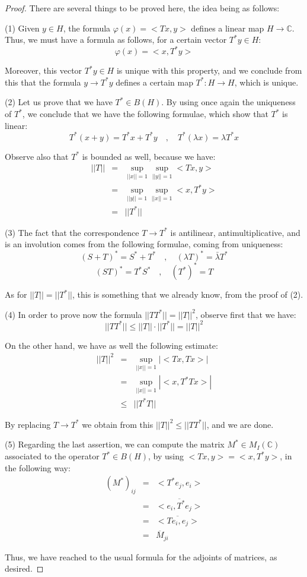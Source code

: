 \documentclass[12pt]{amsbook}
\begin{document}
\begin{proof}
There are several things to be proved here, the idea being as follows:

\medskip

(1) Given $y\in H$, the formula $\varphi(x)=<Tx,y>$ defines a linear map $H\to\mathbb C$. Thus, we must have a formula as follows, for a certain vector $T^*y\in H$:
$$\varphi(x)=<x,T^*y>$$

Moreover, this vector $T^*y\in H$ is unique with this property, and we conclude from this that the formula $y\to T^*y$ defines a certain map $T^*:H\to H$, which is unique.

\medskip

(2) Let us prove that we have $T^*\in B(H)$. By using once again the uniqueness of $T^*$, we conclude that we have the following formulae, which show that $T^*$ is linear:
$$T^*(x+y)=T^*x+T^*y\quad,\quad 
T^*(\lambda x)=\lambda T^*x$$

Observe also that $T^*$ is bounded as well, because we have:
\begin{eqnarray*}
||T||
&=&\sup_{||x||=1}\sup_{||y||=1}<Tx,y>\\
&=&\sup_{||y||=1}\sup_{||x||=1}<x,T^*y>\\
&=&||T^*||
\end{eqnarray*}

(3) The fact that the correspondence $T\to T^*$ is antilinear, antimultiplicative, and is an involution comes from the following formulae, coming from uniqueness:
$$(S+T)^*=S^*+T^*\quad,\quad 
(\lambda T)^*=\bar{\lambda}T^*$$
$$(ST)^*=T^*S^*\quad,\quad 
(T^*)^*=T$$

As for $||T||=||T^*||$, this is something that we already know, from the proof of (2).

\medskip

(4) In order to prove now the formula $||TT^*||=||T||^2$, observe first that we have:
$$||TT^*||
\leq||T||\cdot||T^*||
=||T||^2$$

On the other hand, we have as well the following estimate:
\begin{eqnarray*}
||T||^2
&=&\sup_{||x||=1}|<Tx,Tx>|\\
&=&\sup_{||x||=1}|<x,T^*Tx>|\\
&\leq&||T^*T||
\end{eqnarray*}

By replacing $T\to T^*$ we obtain from this $||T||^2\leq||TT^*||$, and we are done.

\medskip

(5) Regarding the last assertion, we can compute the matrix $M^*\in M_I(\mathbb C)$ associated to the operator $T^*\in B(H)$, by using $<Tx,y>=<x,T^*y>$, in the following way:
\begin{eqnarray*}
(M^*)_{ij}
&=&<T^*e_j,e_i>\\
&=&\overline{<e_i,T^*e_j>}\\
&=&\overline{<Te_i,e_j>}\\
&=&\overline{M}_{ji}
\end{eqnarray*}

Thus, we have reached to the usual formula for the adjoints of matrices, as desired.
\end{proof}
\end{document}
